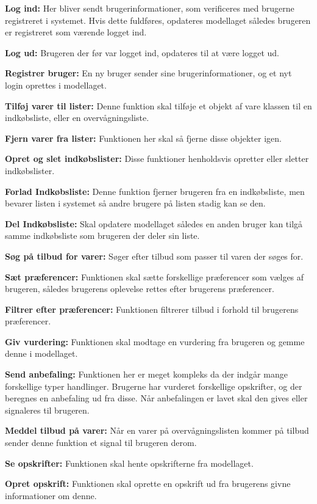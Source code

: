 \textbf{Log ind:} Her bliver sendt brugerinformationer, som verificeres med brugerne registreret i systemet.
Hvis dette fuldføres, opdateres modellaget således brugeren er registreret som værende logget ind.

\textbf{Log ud:} Brugeren der før var logget ind, opdateres til at være logget ud.

\textbf{Registrer bruger:} En ny bruger sender sine brugerinformationer, og et nyt login oprettes i modellaget.

\textbf{Tilføj varer til lister:} Denne funktion skal tilføje et objekt af vare klassen til en indkøbsliste, eller en overvågningsliste.

\textbf{Fjern varer fra lister:} Funktionen her skal så fjerne disse objekter igen.

\textbf{Opret og slet indkøbslister:} Disse funktioner henholdsvis opretter eller sletter indkøbslister.

\textbf{Forlad Indkøbsliste:} Denne funktion fjerner brugeren fra en indkøbsliste, men bevarer listen i systemet så andre brugere på listen stadig kan se den.

\textbf{Del Indkøbsliste:} Skal opdatere modellaget således en anden bruger kan tilgå samme indkøbsliste som brugeren der deler sin liste.

\textbf{Søg på tilbud for varer:} Søger efter tilbud som passer til varen der søges for.

\textbf{Sæt præferencer:} Funktionen skal sætte forskellige præferencer som vælges af brugeren, således brugerens oplevelse rettes efter brugerens præferencer.

\textbf{Filtrer efter præferencer:} Funktionen filtrerer tilbud i forhold til brugerens præferencer.

\textbf{Giv vurdering:} Funktionen skal modtage en vurdering fra brugeren og gemme denne i modellaget.

\textbf{Send anbefaling:} Funktionen her er meget kompleks da der indgår mange forskellige typer handlinger.
Brugerne har vurderet forskellige opskrifter, og der beregnes en anbefaling ud fra disse.
Når anbefalingen er lavet skal den gives eller signaleres til brugeren.

\textbf{Meddel tilbud på varer:} Når en varer på overvågningslisten kommer på tilbud sender denne funktion et signal til brugeren derom.

\textbf{Se opskrifter:} Funktionen skal hente opskrifterne fra modellaget.

\textbf{Opret opskrift:} Funktionen skal oprette en opskrift ud fra brugerens givne informationer om denne.

